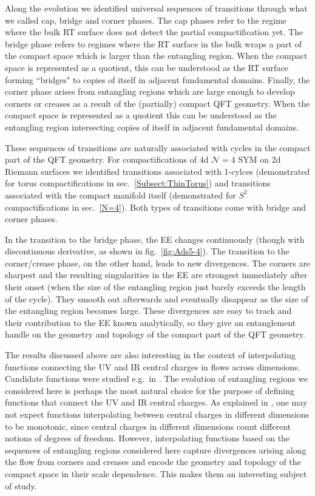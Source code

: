 \documentclass[11 pt]{article}
\begin{document}
Along the evolution we identified universal sequences of transitions through what we called cap, bridge and corner phases. The cap phases refer to the regime where the bulk RT surface does not detect the partial compactification yet. The bridge phase refers to regimes where the RT surface in the bulk wraps a part of the compact space which is larger than the entangling region. When the compact space is represented as a quotient, this can be understood as the RT surface forming ``bridges" to copies of itself in adjacent fundamental domains. Finally, the corner phase arises from entangling regions which are large enough to develop corners or creases as a result of the (partially) compact QFT geometry. When the compact space is represented as a quotient this can be understood as the entangling region intersecting copies of itself in adjacent fundamental domains.

These sequences of transitions are naturally associated with cycles in the compact part of the QFT geometry. For compactifications of 4d $\mathcal N=4$ SYM on 2d Riemann surfaces we identified transitions associated with 1-cylces (demonstrated for torus compactifications in sec.~\ref{Subsect:ThinTorus}) and transitions associated with the compact manifold itself (demonstrated for $S^2$ compactifications in sec.~\ref{N=4}). Both types of transitions come with bridge and corner phases. 

In the transition to the bridge phase, the EE changes continuously (though with discontinuous derivative, as shown in fig.~\ref{fig:Ads5-4}). The transition to the corner/crease phase, on the other hand, leads to new divergences. The corners are sharpest and the resulting singularities in the EE are strongest immediately after their onset (when the size of the entangling region just barely exceeds the length of the cycle). They smooth out afterwards and eventually disappear as the size of the entangling region becomes large. These divergences are easy to track and their contribution to the EE known analytically, so they give an entanglement handle on the geometry and topology of the compact part of the QFT geometry.

The results discussed above are also interesting in the context of interpolating functions connecting the UV and IR central charges in flows across dimensions. 
Candidate functions  were studied e.g.\ in \cite{Macpherson:2014eza,GonzalezLezcano:2022mcd,Bea:2015fja,Chu:2019uoh,Legramandi:2021aqv,Merrikin:2022yho}.
The evolution of entangling regions we considered here is perhaps the most natural choice for the purpose of defining functions that connect the UV and IR central charges. 
As explained in \cite{GonzalezLezcano:2022mcd}, one may not expect functions interpolating between central charges in different dimensions to be monotonic, since central charges in different dimensions count different notions of degrees of freedom.
%
However, interpolating functions based on the sequences of entangling regions considered here capture divergences arising along the flow from corners and creases and  encode the geometry and topology of the compact space in their scale dependence. This makes them an interesting subject of study.
\end{document}
